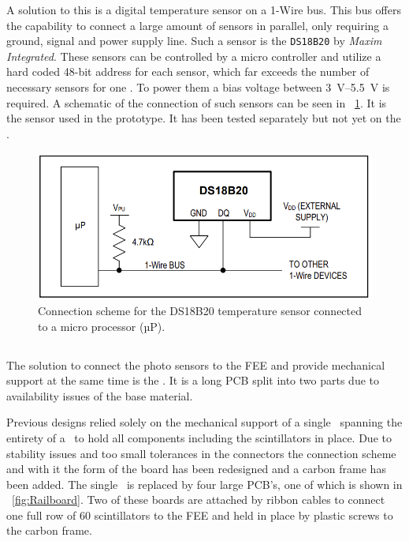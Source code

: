 \documentclass[../BTOF_summary.tex]{subfiles}
\begin{document}
A solution to this is a digital temperature sensor on a 1-Wire bus.
This bus offers the capability to connect a large amount of sensors in parallel, only requiring a ground, signal and power supply line.
Such a sensor is the \texttt{DS18B20} by \textit{Maxim Integrated}.
These sensors can be controlled by a micro controller and utilize a hard coded 48-bit address for each sensor, which far exceeds the number of necessary sensors for one \railboard .
To power them a bias voltage between \SIrange[]{3}{5.5}{V} is required.
A schematic of the connection of such sensors can be seen in \fig ~\ref{fig:DS18B20_connection}.
It is the sensor used in the prototype.
It has been tested separately but not yet on the \railboard .

\begin{figure}[htbp]
	\centering
	\includegraphics[width=.6\textwidth]{fig/DS18B20_connection.png}
	\caption[Connection scheme for the DS18B20 temperature sensor.]{Connection scheme for the DS18B20 temperature sensor connected to a micro processor (µP).}
	\label{fig:DS18B20_connection}
\end{figure}



\subsection{\railboard}

The solution to connect the photo sensors to the FEE and provide mechanical support at the same time is the \railboard .
It is a long PCB split into two parts due to availability issues of the base material.

Previous designs relied solely on the mechanical support of a single \railboard\ spanning the entirety of a \sm\ to hold all components including the scintillators in place.
Due to stability issues and too small tolerances in the connectors the connection scheme and with it the form of the board has been redesigned and a carbon frame has been added.
The single \railboard\ is replaced by four large PCB's, one of which is shown in \fig ~\ref{fig:Railboard}.
Two of these boards are attached by ribbon cables to connect one full row of 60 scintillators to the FEE and held in place by plastic screws to the carbon frame.
\end{document}

